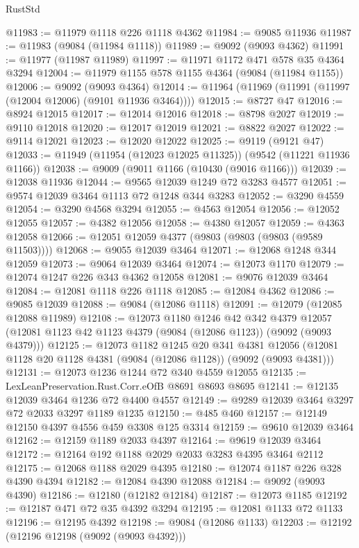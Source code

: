 \begin{lexlean}{RustStd}
\begin{coremodule}
@11983 := @11979 @1118 @226 @1118 @4362
@11984 := @9085 @11936
@11987 := @11983 (@9084 (@11984 @1118))
@11989 := @9092 (@9093 @4362)
@11991 := @11977 (@11987 @11989)
@11997 := @11971 @1172 @471 @578 @35 @4364 @3294
@12004 := @11979 @1155 @578 @1155 @4364 (@9084 (@11984 @1155))
@12006 := @9092 (@9093 @4364)
@12014 := @11964 (@11969 (@11991 (@11997 (@12004 @12006) (@9101 @11936 @3464))))
@12015 := @8727 @47
@12016 := @8924 @12015
@12017 := @12014 @12016
@12018 := @8798 @2027
@12019 := @9110 @12018
@12020 := @12017 @12019
@12021 := @8822 @2027
@12022 := @9114 @12021
@12023 := @12020 @12022
@12025 := @9119 (@9121 @47)
@12033 := @11949 (@11954 (@12023 @12025 @11325)) (@9542 (@11221 @11936 @1166))
@12038 := @9009 (@9011 @1166 (@10430 (@9016 @1166)))
@12039 := @12038 @11936
@12044 := @9565 @12039 @1249 @72 @3283 @4577
@12051 := @9574 @12039 @3464 @1113 @72 @1248 @344 @3283
@12052 := @3290 @4559
@12054 := @3290 @4568 @3294
@12055 := @4563 @12054
@12056 := @12052 @12055
@12057 := @4382 @12056
@12058 := @4380 @12057
@12059 := @4363 @12058
@12066 := @12051 @12059 @4377 (@9803 (@9803 (@9803 (@9589 @11503))))
@12068 := @9055 @12039 @3464
@12071 := @12068 @1248 @344 @12059
@12073 := @9064 @12039 @3464
@12074 := @12073 @1170
@12079 := @12074 @1247 @226 @343 @4362 @12058
@12081 := @9076 @12039 @3464
@12084 := @12081 @1118 @226 @1118
@12085 := @12084 @4362
@12086 := @9085 @12039
@12088 := @9084 (@12086 @1118)
@12091 := @12079 (@12085 @12088 @11989)
@12108 := @12073
    @1180
    @1246
    @42
    @342
    @4379
    @12057
    (@12081 @1123 @42 @1123 @4379 (@9084 (@12086 @1123)) (@9092 (@9093 @4379)))
@12125 := @12073
    @1182
    @1245
    @20
    @341
    @4381
    @12056
    (@12081 @1128 @20 @1128 @4381 (@9084 (@12086 @1128)) (@9092 (@9093 @4381)))
@12131 := @12073 @1236 @1244 @72 @340 @4559 @12055
@12135 := LexLeanPreservation.Rust.Corr.eOfB @8691 @8693 @8695
@12141 := @12135 @12039 @3464 @1236 @72 @4400 @4557
@12149 := @9289 @12039 @3464 @3297 @72 @2033 @3297 @1189 @1235
@12150 := @485 @460
@12157 := @12149 @12150 @4397 @4556 @459 @3308 @125 @3314
@12159 := @9610 @12039 @3464
@12162 := @12159 @1189 @2033 @4397
@12164 := @9619 @12039 @3464
@12172 := @12164 @192 @1188 @2029 @2033 @3283 @4395 @3464 @2112
@12175 := @12068 @1188 @2029 @4395
@12180 := @12074 @1187 @226 @328 @4390 @4394
@12182 := @12084 @4390 @12088
@12184 := @9092 (@9093 @4390)
@12186 := @12180 (@12182 @12184)
@12187 := @12073 @1185
@12192 := @12187 @471 @72 @35 @4392 @3294
@12195 := @12081 @1133 @72 @1133
@12196 := @12195 @4392
@12198 := @9084 (@12086 @1133)
@12203 := @12192 (@12196 @12198 (@9092 (@9093 @4392)))

\end{coremodule}
\end{lexlean}
